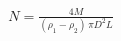 \documentclass[preview]{standalone}
\begin{document}
\begin{align*}
N = \tfrac{4M}{(\rho_1-\rho_2)\,\pi D^2 L}
\end{align*}
\end{document}
